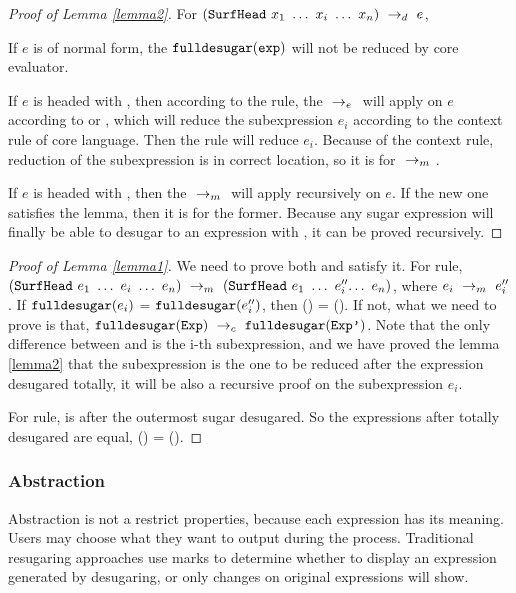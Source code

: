 \begin{proof}[Proof of Lemma \ref{lemma2}]
For $(\mbox{\tt SurfHead}~x_1~\ldots~x_i~\ldots~x_n) ~\rightarrow_d~ e$,

If $e$ is of normal form, the $\mbox{\tt fulldesugar}(\mbox{\tt exp})$ will not be reduced by core evaluator.

If $e$ is headed with , then according to the  rule, the $~\rightarrow_e~$ will apply on $e$ according to  or , which will reduce the subexpression $e_i$ according to the context rule of core language. Then the  rule will reduce $e_i$. Because of the context rule, reduction of the subexpression is in correct location, so it is for $~\rightarrow_m~$.

If $e$ is headed with , then the $~\rightarrow_m~$ will apply recursively on $e$. If the new one satisfies the lemma, then it is for the former. Because any sugar expression will finally be able to desugar to an expression with , it can be proved recursively.
\end{proof}
\begin{proof}[Proof of Lemma \ref{lemma1}]
We need to prove both  and  satisfy it.
For  rule, $\redm{(\m{SurfHead}~e_1~\ldots~e_i~\ldots~e_n)}{(\m{SurfHead}~e_1~\ldots~e_i''$$\ldots~e_n)}$, where $e_i ~\rightarrow_m~e_i''$.
If $\mbox{\tt fulldesugar}(e_i)$ = $\mbox{\tt fulldesugar}(e_i'')$, then () = (). If not,  what we need to prove is that, $\mbox{\tt fulldesugar}(\mbox{\tt Exp}) ~\rightarrow_c~\mbox{\tt fulldesugar}(\mbox{\tt Exp'})$. Note that the only difference between  and  is the i-th subexpression, and we have proved the lemma \ref{lemma2} that the subexpression is the one to be reduced after the expression desugared totally, it will be also a recursive proof on the subexpression $e_i$.

For  rule,  is  after the outermost sugar desugared. So the expressions after totally desugared are equal, () =
().
\end{proof}


\subsubsection{Abstraction}
\label{mark:abs}

Abstraction is not a restrict properties, because each expression has its meaning. Users may choose what they want to output during the process. Traditional resugaring approaches use marks to determine whether to display an expression generated by desugaring, or only changes on original expressions will show.

